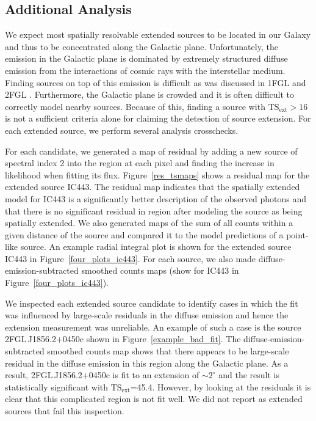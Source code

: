 \documentclass[12pt,preprint]{aastex}
\newcommand{\gev}{\text{GeV}\xspace}
\newcommand{\tsext}{{\ensuremath{\text{TS}_{\text{ext}}}}\xspace}
\newcommand{\ts}{\text{TS}\xspace}
\newcommand{\degree}{^\circ\xspace}
\begin{document}
\subsection{Additional Analysis}

We expect most spatially resolvable extended sources to be located
in our Galaxy and thus to be concentrated along the Galactic plane.
Unfortunately, the \gev emission in the Galactic plane is dominated by
extremely structured diffuse emission from the interactions of cosmic rays
with the interstellar medium.  Finding sources on top of this emission
is difficult as was discussed in 1FGL
and 2FGL \citep{first_cat,second_cat}.  Furthermore, the Galactic plane
is crowded and it is often difficult to correctly model nearby sources.
Because of this, finding a source with $\tsext>16$ is not a sufficient
criteria alone for claiming the detection of source extension.  For each
extended source, we perform several analysis crosschecks.

For each candidate, we generated a map of residual \ts by adding a new
source of spectral index 2 into the region at each pixel and finding the
increase in likelihood when fitting its flux. Figure~\ref{res_tsmaps}
shows a residual \ts map for the extended source IC443.  The residual
\ts map indicates that the spatially extended model for IC443 is a
significantly better description of the observed photons
and that there is no significant residual in region after modeling
the source as being spatially extended.  We also
generated maps of the sum of all counts within a given distance of
the source and compared it to the model predictions of a point-like source.
An example radial integral plot is shown for the extended source
IC443 in Figure~\ref{four_plots_ic443}.  For each source, we also made
diffuse-emission-subtracted smoothed counts maps (show for IC443 in
Figure~\ref{four_plots_ic443}).

We inspected each extended source candidate to identify cases in
which the fit was influenced by large-scale residuals in
the diffuse emission and hence the extension measurement was unreliable.
An example of such a case is 
the source 2FGL\,J1856.2+0450c 
shown in Figure~\ref{example_bad_fit}. The
diffuse-emission-subtracted smoothed
counts map shows that
there appears to be large-scale
residual in the diffuse emission
in this region along the Galactic plane.
As a result, 2FGL\,J1856.2+0450c is fit
to an extension of $\sim2\degree$ and the result is statistically significant
with \tsext=45.4. However, by looking at the residuals it is clear
that this complicated region is not fit well.
We did not report as extended sources that fail this inspection.
\end{document}
